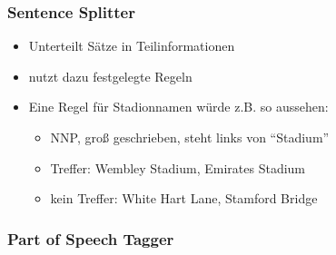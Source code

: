 \begin{frame}
  \frametitle{Sentence Splitter}
  \begin{itemize}
  \item Unterteilt Sätze in Teilinformationen
  \item nutzt dazu festgelegte Regeln
  \item Eine Regel für Stadionnamen würde z.B. so aussehen: 
    \begin{itemize}
    \item NNP, groß geschrieben, steht links von ``Stadium''
    \item Treffer: Wembley Stadium, Emirates Stadium
    \item kein Treffer: White Hart Lane, Stamford Bridge
    \end{itemize}
  \end{itemize}
\end{frame}

\begin{frame}
  \frametitle{Part of Speech Tagger}
  \begin{itemize}

  \end{itemize}
\end{frame}
